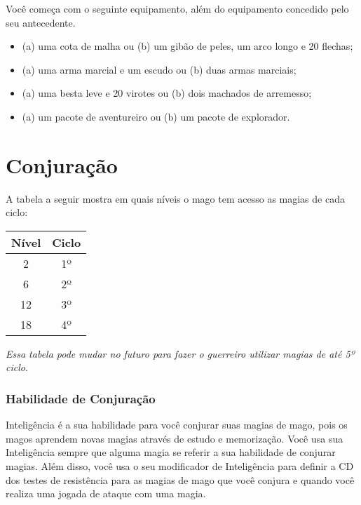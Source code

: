 \documentclass{RPG_Adventure}[2021/10/20]
\begin{document}
Você começa com o seguinte equipamento, além do equipamento concedido pelo seu
antecedente.
\begin{itemize}
    \item (a) uma cota de malha ou (b) um gibão de peles, um arco longo e 20
        flechas;
    \item (a) uma arma marcial e um escudo ou (b) duas armas marciais;
    \item (a) uma besta leve e 20 virotes ou (b) dois machados de arremesso;
    \item (a) um pacote de aventureiro ou (b) um pacote de explorador.
\end{itemize}

\section*{Conjuração}%

A tabela a seguir mostra em quais níveis o mago tem acesso as magias de cada
ciclo:

\begin{center}
\begin{tabular}{|||c||c|||}
    \hline
    \textbf{Nível} & \textbf{Ciclo} \\
    \hline
    2 & 1º \\
    \hline
    6 & 2º \\
    \hline
    12 & 3º \\
    \hline
    18 & 4º \\
    \hline
\end{tabular}
\end{center}

\begin{obs}
\textit{Essa tabela pode mudar no futuro para fazer o guerreiro utilizar magias
de até 5º ciclo}.
\end{obs}

\subsubsection*{Habilidade de Conjuração}%

Inteligência é a sua habilidade para você conjurar suas magias de mago, pois os
magos aprendem novas magias através de estudo e memorização. Você usa sua
Inteligência sempre que alguma magia se referir a sua habilidade de conjurar
magias. Além disso, você usa o seu modificador de Inteligência para definir a CD
dos testes de resistência para as magias de mago que você conjura e quando você
realiza uma jogada de ataque com uma magia.
\end{document}
